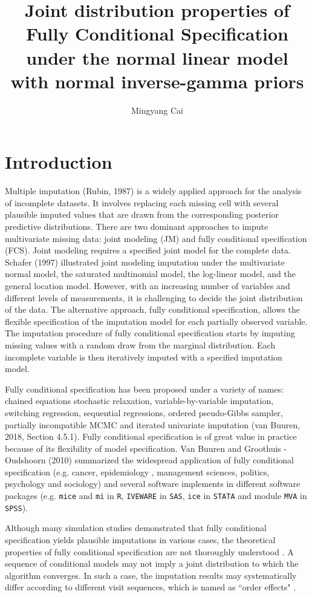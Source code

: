 \documentclass[12pt, fullpage, a4paper]{article}
\title{Joint distribution properties of Fully Conditional Specification under the normal linear model with normal inverse-gamma priors}
\author{Mingyang Cai}
\date{}
\begin{document}
\maketitle
\section{Introduction}
Multiple imputation (Rubin, 1987) is a widely applied approach for the analysis of incomplete datasets. It involves replacing each missing cell with several plausible imputed values that are drawn from the corresponding posterior predictive distributions. There are two dominant approaches to impute multivariate missing data: joint modeling (JM) and fully conditional specification (FCS). Joint modeling requires a specified joint model for the complete data. Schafer\nocite{schafer1997analysis} (1997) illustrated joint modeling imputation under the multivariate normal model, the saturated multinomial model, the log-linear model, and the general location model. However, with an increasing number of variables and different levels of measurements, it is challenging to decide the joint distribution of the data. The alternative approach, fully conditional specification, allows the flexible specification of the imputation model for each partially observed variable. The imputation procedure of fully conditional specification starts by imputing missing values with a random draw from the marginal distribution. Each incomplete variable is then iteratively imputed with a specified imputation model. 

Fully conditional specification has been proposed under a variety of names: chained equations stochastic relaxation, variable-by-variable imputation, switching regression, sequential regressions, ordered pseudo-Gibbs sampler, partially incompatible MCMC and iterated univariate imputation (van Buuren, 2018, Section 4.5.1)\nocite{van2018flexible}. Fully conditional specification is of great value in practice because of its flexibility of model specification. Van Buuren and Groothuis - Oudshoorn (2010)\nocite{buuren2010mice} summarized the widespread application of fully conditional specification (e.g. cancer, epidemiology , management sciences, politics, psychology and sociology) and several software implements in different software packages (e.g. \texttt{mice} and \texttt{mi} in \texttt{R}, \texttt{IVEWARE} in \texttt{SAS}, \texttt{ice} in \texttt{STATA} and module \texttt{MVA} in \texttt{SPSS}). 

Although many simulation studies demonstrated that fully conditional specification yields plausible imputations in various cases, the theoretical properties of fully conditional specification are not thoroughly understood \cite{van2007multiple}. A sequence of conditional models may not imply a joint distribution to which the algorithm converges. In such a case, the imputation results may systematically differ according to different visit sequences, which is named as ``order effects" \cite{hughes2014joint}. 
\end{document}
